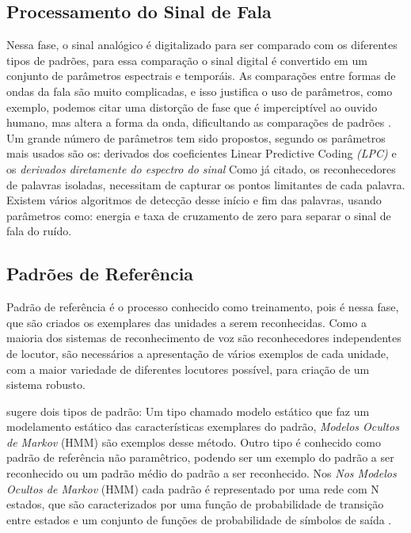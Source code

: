 \subsection{Processamento do Sinal de Fala}
Nessa fase, o sinal analógico é digitalizado para ser comparado com os diferentes tipos de padrões, para essa comparação o sinal digital é convertido em um conjunto de parâmetros espectrais e temporáis. As comparações entre formas de ondas da fala são muito complicadas, e isso justifica o uso de parâmetros, como exemplo, podemos citar uma distorção de fase que é imperciptível ao ouvido humano, mas altera a forma da onda, dificultando as comparações de padrões \cite{AvaliaTecJose}.
Um grande número de parâmetros tem sido propostos, segundo  os parâmetros mais usados são os: derivados dos coeficientes Linear Predictive Coding \textit{(LPC)} e os \textit{derivados diretamente do espectro do sinal}
Como já citado, os reconhecedores de palavras isoladas, necessitam de capturar os pontos limitantes de cada palavra. Existem vários algoritmos de detecção desse início e fim das palavras, usando parâmetros como: energia e taxa de cruzamento de zero para separar o sinal de fala do ruído.

\subsection{Padrões de Referência}
Padrão de referência é o processo conhecido como treinamento, pois é nessa fase, que são criados os exemplares das unidades a serem reconhecidas. Como a maioria dos sistemas de reconhecimento de voz são reconhecedores independentes de locutor, são necessários a apresentação de vários exemplos de cada unidade, com a maior variedade de diferentes locutores possível, para criação de um sistema robusto.

 sugere dois tipos de padrão: Um tipo chamado modelo estático que faz um modelamento estático das características exemplares do padrão, \textit{Modelos Ocultos de Markov} (HMM) são exemplos desse método. Outro tipo é conhecido como padrão de referência não paramêtrico, podendo ser um exemplo do padrão a ser reconhecido ou um padrão médio do padrão a ser reconhecido.
Nos \textit{Nos Modelos Ocultos de Markov} (HMM) cada padrão é representado por uma rede com N estados, que são caracterizados por uma função de probabilidade de transição entre estados e um conjunto de funções de probabilidade de símbolos de saída \cite{AvaliaTecJose}.


